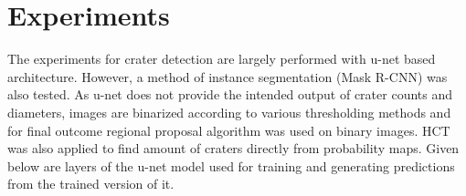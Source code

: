 \documentclass[11pt]{article}
\begin{document}

\newpage
\section{Experiments}
The experiments for crater detection are largely performed with u-net based architecture. However, a method of instance segmentation (Mask R-CNN) was also tested. As u-net does not provide the intended output of crater counts and diameters, images are binarized according to various thresholding methods and for final outcome regional proposal algorithm was used on binary images. HCT was also applied to find amount of craters directly from probability maps. Given below are layers of the u-net model used for training and generating predictions from the trained version of it.
\end{document}
